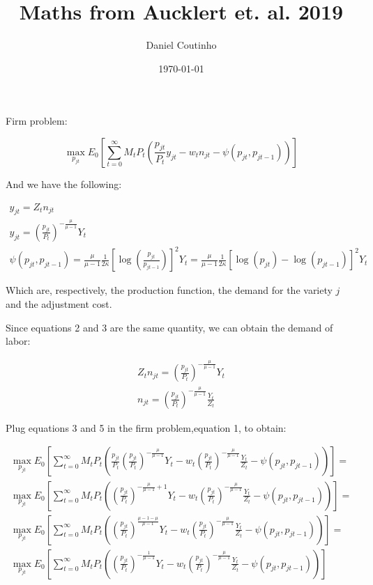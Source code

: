 \documentclass[a4paper,10pt]{article}
\title{Maths from Aucklert et. al. 2019}
\author{Daniel Coutinho}
\date{\today}
\begin{document}
	
	Firm problem:
	
	\begin{equation}
		\max_{p_{jt}} E_0\left[\sum_{t=0}^{\infty} M_t P_t\left(\frac{p_{jt}}{P_t} y_{jt} - w_t n_{jt} - \psi(p_{jt},p_{jt-1})\right) \right]
	\end{equation}
	
	And we have the following:
	
	\begin{gather}
		y_{jt} = Z_t n_{jt}\\
		y_{jt} = \left(\frac{p_{jt}}{P_t}\right)^{-\frac{\mu}{\mu-1}}Y_t\\
		\psi(p_{jt},p_{jt-1}) = \frac{\mu}{\mu-1}\frac{1}{2\kappa}\left[\log\left(\frac{p_{jt}}{p_{jt-1}}\right)\right]^2Y_t = \frac{\mu}{\mu-1}\frac{1}{2\kappa}\left[\log(p_{jt})-\log(p_{jt-1})\right]^2Y_t
	\end{gather} 
	
	Which are, respectively, the production function, the demand for the variety $j$ and the adjustment cost.
	
	Since equations 2 and 3 are the same quantity, we can obtain the demand of labor:
	
	\begin{gather}
		Z_t n_{jt} = \left(\frac{p_{jt}}{P_t}\right)^{-\frac{\mu}{\mu-1}}Y_t \nonumber\\
		n_{jt} = \left(\frac{p_{jt}}{P_t}\right)^{-\frac{\mu}{\mu-1}}\frac{Y_t}{Z_t}
	\end{gather}

	Plug equations 3 and 5 in the firm problem,equation 1, to obtain:
	
	\begin{gather}
		\max_{p_{jt}} E_0\left[\sum_{t=0}^{\infty} M_t P_t \left(\frac{p_{jt}}{P_t}\left(\frac{p_{jt}}{P_t}\right)^{-\frac{\mu}{\mu-1}}Y_t - w_t \left(\frac{p_{jt}}{P_t}\right)^{-\frac{\mu}{\mu-1}}\frac{Y_t}{Z_t} - \psi(p_{jt},p_{jt-1})\right)\right] = \nonumber \\
		\max_{p_{jt}} E_0\left[\sum_{t=0}^{\infty} M_t P_t \left(\left(\frac{p_{jt}}{P_t}\right)^{-\frac{\mu}{\mu-1}+1}Y_t - w_t \left(\frac{p_{jt}}{P_t}\right)^{-\frac{\mu}{\mu-1}}\frac{Y_t}{Z_t} - \psi(p_{jt},p_{jt-1})\right)\right] = \nonumber \\
		\max_{p_{jt}} E_0\left[\sum_{t=0}^{\infty} M_t P_t \left(\left(\frac{p_{jt}}{P_t}\right)^{\frac{\mu -1 - \mu}{\mu-1}}Y_t - w_t \left(\frac{p_{jt}}{P_t}\right)^{-\frac{\mu}{\mu-1}}\frac{Y_t}{Z_t} - \psi(p_{jt},p_{jt-1})\right)\right] = \nonumber\\
		\max_{p_{jt}} E_0\left[\sum_{t=0}^{\infty} M_t P_t \left(\left(\frac{p_{jt}}{P_t}\right)^{-\frac{1}{\mu-1}}Y_t - w_t \left(\frac{p_{jt}}{P_t}\right)^{-\frac{\mu}{\mu-1}}\frac{Y_t}{Z_t} - \psi(p_{jt},p_{jt-1})\right)\right]
	\end{gather}
\end{document}
